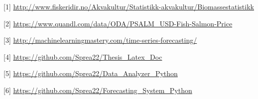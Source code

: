 
[1] \url{http://www.fiskeridir.no/Akvakultur/Statistikk-akvakultur/Biomassestatistikk}


[2] \url{https://www.quandl.com/data/ODA/PSALM_USD-Fish-Salmon-Price}


[3] \url{http://machinelearningmastery.com/time-series-forecasting/}


[4] \url{https://github.com/Sprea22/Thesis_Latex_Doc}


[5] \url{https://github.com/Sprea22/Data_Analyzer_Python}


[6] \url{https://github.com/Sprea22/Forecasting_System_Python}

